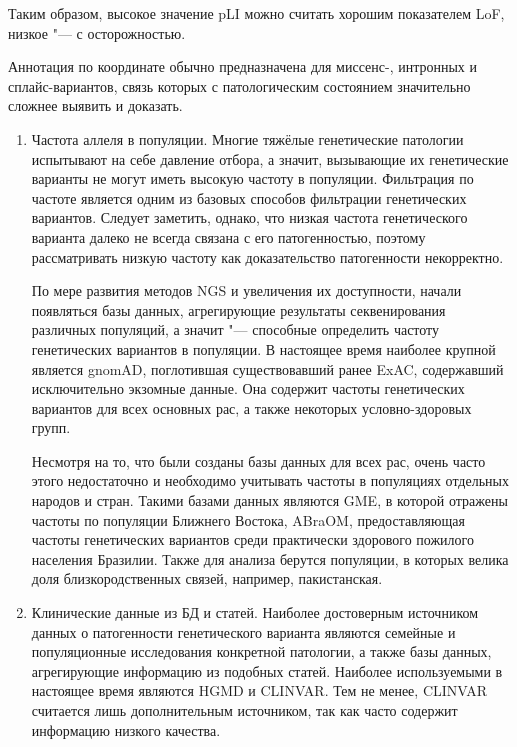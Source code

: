 \documentclass[a4paper,12pt]{article}
\begin{document}
\begin{enumerate}
Таким образом, высокое значение pLI можно считать хорошим показателем LoF, низкое "--- с осторожностью.                                                                                                       \end{enumerate}

Аннотация по координате обычно предназначена для миссенс-, интронных и сплайс-вариантов, связь которых с патологическим состоянием значительно сложнее выявить и доказать.

\begin{enumerate}
\item Частота аллеля в популяции.
Многие тяжёлые генетические патологии испытывают на себе давление отбора, а значит, вызывающие их генетические варианты не могут иметь высокую частоту в популяции.
Фильтрация по частоте является одним из базовых способов фильтрации генетических вариантов.
Следует заметить, однако, что низкая частота генетического варианта далеко не всегда связана с его патогенностью, поэтому рассматривать низкую частоту как доказательство патогенности некорректно.

По мере развития методов NGS и увеличения их доступности, начали появляться базы данных, агрегирующие результаты секвенирования различных популяций, а значит "--- способные определить частоту генетических вариантов в популяции.
В настоящее время наиболее крупной является gnomAD\cite{Karczewski_2020}, поглотившая существовавший ранее ExAC, содержавший исключительно экзомные данные.
Она содержит частоты генетических вариантов для всех основных рас, а также некоторых условно-здоровых групп.

Несмотря на то, что были созданы базы данных для всех рас, очень часто этого недостаточно и необходимо учитывать частоты в популяциях отдельных народов и стран.
Такими базами данных являются GME\cite{Scott_2016}, в которой отражены частоты по популяции Ближнего Востока, ABraOM\cite{Naslavsky_2017}, предоставляющая частоты генетических вариантов среди практически здорового пожилого населения Бразилии.
Также для анализа берутся популяции, в которых велика доля близкородственных связей, например, пакистанская\cite{Saleheen_2017}.

\item Клинические данные из БД и статей.
Наиболее достоверным источником данных о патогенности генетического варианта являются семейные и популяционные исследования конкретной патологии, а также базы данных, агрегирующие информацию из подобных статей.
Наиболее используемыми в настоящее время являются HGMD\cite{Stenson_2017} и CLINVAR.
Тем не менее, CLINVAR считается лишь дополнительным источником, так как часто содержит информацию низкого качества\cite{Ryzhkova_2017}.


\end{enumerate}
\end{document}
